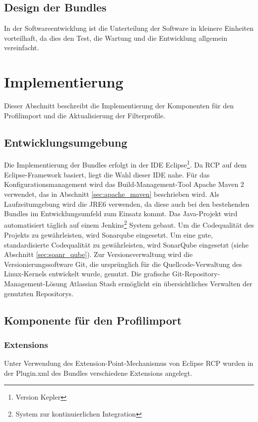 {\subsection{Design der Bundles}{
In der Softwareentwicklung ist die Unterteilung der Software in kleinere Einheiten vorteilhaft, da dies den Test, die Wartung und die Entwicklung allgemein vereinfacht.




}

\section{Implementierung}{
\label{sec:implementierung}
Dieser Abschnitt beschreibt die Implementierung der Komponenten für den Profilimport und die Aktualisierung der Filterprofile.

\subsection{Entwicklungsumgebung}{
Die Implementierung der Bundles erfolgt in der \ac{IDE} Eclipse\footnote{Version Kepler}. Da \ac{RCP} auf dem Eclipse-Framework basiert, liegt die Wahl dieser \ac{IDE} nahe. Für das Konfigurationsmanagement wird das Build-Management-Tool Apache Maven 2 verwendet, das in Abschnitt \ref{sec:apache_maven} beschrieben wird. Als Laufzeitumgebung wird die \ac{JRE}6 verwenden, da diese auch bei den bestehenden Bundles im Entwicklungsumfeld zum Einsatz kommt. Das Java-Projekt wird automatisiert täglich auf einem Jenkins\footnote{System zur kontinuierlichen Integration} System gebaut. Um die Codequalität des Projekts zu gewährleisten, wird Sonarqube\textsuperscript{\texttrademark} eingesetzt. Um eine gute, standardisierte Codequalität zu gewährleisten, wird SonarQube\textsuperscript{\texttrademark} eingesetzt (siehe Abschnitt \ref{sec:soanr_qube}). Zur \gls{Versionsverwaltung} wird die Versionierungssoftware Git, die ursprünglich für die Quellcode-Verwaltung des Linux-Kernels entwickelt wurde, genutzt. Die grafische Git-Repository-Management-Lösung Atlassian Stash ermöglicht ein übersichtliches Verwalten der genutzten \glspl{Repository}.
}




\subsection{Komponente für den Profilimport}{
\label{sec:impl_import}

\subsubsection{Extensions}{
Unter Verwendung des Extension-Point-Mechanismus von Eclipse \ac{RCP} wurden in der Plugin.xml des Bundles verschiedene Extensions angelegt.\\

}}}}
